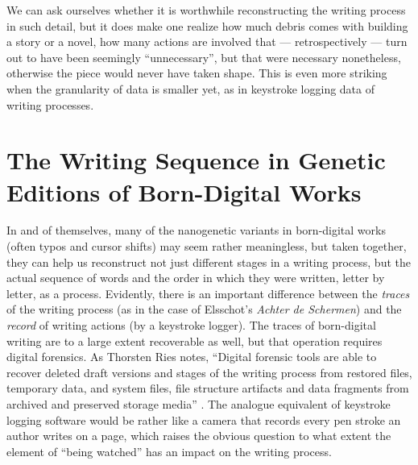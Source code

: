 \begin{paper}
We can ask ourselves whether it is worthwhile reconstructing the writing
process in such detail, but it does make one realize how much debris
comes with building a story or a novel, how many actions are involved
that --- retrospectively --- turn out to have been seemingly
``unnecessary'', but that were necessary nonetheless, otherwise the piece
would never have taken shape. This is even more striking when the
granularity of data is smaller yet, as in keystroke logging data of
writing processes.

\section*{The Writing Sequence in Genetic Editions of Born-Digital Works}

In and of themselves, many of the nanogenetic variants in born-digital
works (often typos and cursor shifts) may seem rather meaningless, but
taken together, they can help us reconstruct not just different stages
in a writing process, but the actual sequence of words and the order in
which they were written, letter by letter, as a process. Evidently,
there is an important difference between the \emph{traces} of the
writing process (as in the case of Elsschot's \emph{Achter de Schermen})
and the \emph{record} of writing actions (by a keystroke logger). The
traces of born-digital writing are to a large extent recoverable as
well, but that operation requires digital forensics. As Thorsten Ries
notes, ``Digital forensic tools are able to recover deleted draft
versions and stages of the writing process from restored files,
temporary data, and system files, file structure artifacts and data
fragments from archived and preserved storage media'' \citep[393]{ries_rationale_2018}.
The analogue equivalent of keystroke logging software would be rather
like a camera that records every pen stroke an author writes on a page,
which raises the obvious question to what extent the element of ``being
watched'' has an impact on the writing process.


\end{paper}
